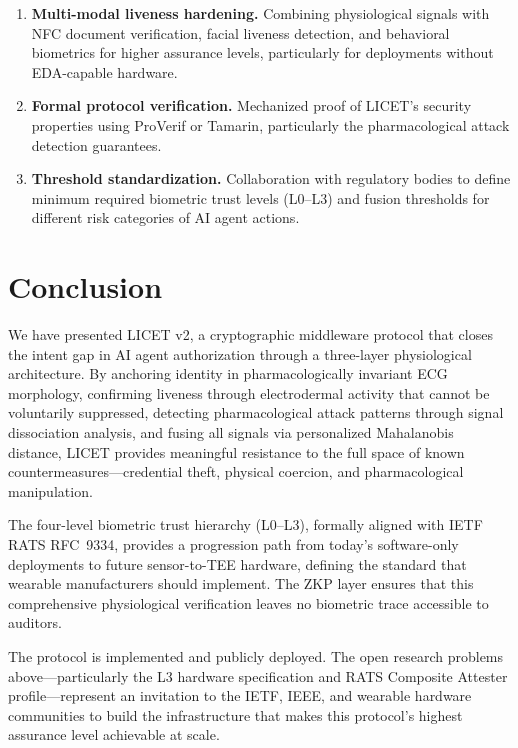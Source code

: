\documentclass[12pt,a4paper]{article}
\begin{document}
\begin{enumerate}
  \item \textbf{Multi-modal liveness hardening.} Combining physiological
  signals with NFC document verification, facial liveness detection, and
  behavioral biometrics for higher assurance levels, particularly for
  deployments without EDA-capable hardware.

  \item \textbf{Formal protocol verification.} Mechanized proof of LICET's
  security properties using ProVerif or Tamarin, particularly the
  pharmacological attack detection guarantees.

  \item \textbf{Threshold standardization.} Collaboration with regulatory
  bodies to define minimum required biometric trust levels (L0--L3) and fusion
  thresholds for different risk categories of AI agent actions.
\end{enumerate}

\section{Conclusion}

We have presented LICET v2, a cryptographic middleware protocol that closes the
intent gap in AI agent authorization through a three-layer physiological
architecture. By anchoring identity in pharmacologically invariant ECG
morphology, confirming liveness through electrodermal activity that cannot be
voluntarily suppressed, detecting pharmacological attack patterns through
signal dissociation analysis, and fusing all signals via personalized
Mahalanobis distance, LICET provides meaningful resistance to the full space
of known countermeasures---credential theft, physical coercion, and
pharmacological manipulation.

The four-level biometric trust hierarchy (L0--L3), formally aligned with IETF
RATS RFC~9334, provides a progression path from today's software-only
deployments to future sensor-to-TEE hardware, defining the standard that
wearable manufacturers should implement. The ZKP layer ensures that this
comprehensive physiological verification leaves no biometric trace accessible
to auditors.

The protocol is implemented and publicly deployed. The open research problems
above---particularly the L3 hardware specification and RATS Composite Attester
profile---represent an invitation to the IETF, IEEE, and wearable hardware
communities to build the infrastructure that makes this protocol's highest
assurance level achievable at scale.
\end{document}
